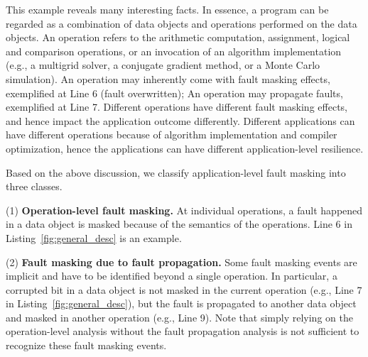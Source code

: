 This example reveals many interesting facts.
In essence, a program can be regarded as a combination of data objects and
operations performed on the data objects.
An operation refers to the arithmetic computation, assignment, logical and comparison operations,  
or an invocation of an algorithm implementation (e.g.,  a multigrid solver, a conjugate gradient method, or a Monte Carlo simulation).  %
An operation may inherently come with fault masking effects, exemplified at Line 6 (fault overwritten);
An operation may propagate faults, exemplified at Line 7. 
Different operations have different fault masking effects, and hence
impact the application outcome differently.
Different applications can have different operations because of
algorithm implementation and compiler optimization, hence the
applications can have different application-level resilience.


Based on the above discussion, we classify application-level fault masking 
into three classes.

(1) \textbf{Operation-level fault masking.} At individual operations, a fault happened in a data object is masked because of the semantics of the operations. Line 6 in
Listing~\ref{fig:general_desc} is an example.

(2) \textbf{Fault masking due to fault propagation.} 
Some fault masking events are implicit and have to be identified beyond a single operation. %
In particular, a corrupted bit in a data object is not masked in the current operation (e.g., Line 7 in 
Listing~\ref{fig:general_desc}),
but the fault is propagated to another data object and masked in another operation (e.g., Line 9).
Note that simply relying on the operation-level analysis without the fault propagation analysis is not sufficient to recognize these fault masking events.

